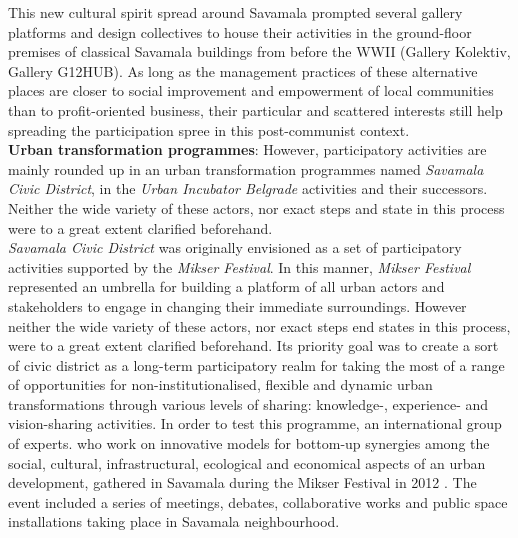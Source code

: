 \documentclass[11pt]{report}
\begin{document}
This new cultural spirit spread around Savamala prompted several gallery platforms and design collectives to house their activities in the ground-floor premises of classical Savamala buildings from before the WWII (Gallery Kolektiv, Gallery G12HUB).
As long as the management practices of these alternative places are closer to social improvement and empowerment of local communities than to profit-oriented business, their particular and scattered interests still help spreading the participation spree in this post-communist context.
\\	
\textbf{Urban transformation programmes}:
However, participatory activities are mainly rounded up in an urban transformation programmes named \textit{Savamala Civic District}, in the \textit{Urban Incubator Belgrade} activities and their successors. Neither the wide variety of these actors, nor exact steps and state in this process were to a great extent clarified beforehand.
\\
\textit{Savamala Civic District} was originally envisioned as a set of participatory activities supported by the \textit{Mikser Festival}. In this manner, \textit{Mikser Festival} represented an umbrella for building a platform of all urban actors and stakeholders to engage in changing their immediate surroundings. However neither the wide variety of these actors, nor exact steps end states in this process, were to a great extent clarified beforehand. Its priority goal was to create a sort of civic district as a long-term participatory realm for taking the most of a range of opportunities for non-institutionalised, flexible and dynamic urban transformations through various levels of sharing: knowledge-, experience- and vision-sharing activities. In order to test this programme, an international group of experts. who work on innovative models for bottom-up synergies among the social, cultural, infrastructural, ecological and economical aspects of an urban development, gathered in Savamala during the Mikser Festival in 2012 \cite{Cvetinovic et al 2013}. The event included a series of meetings, debates, collaborative works and public space installations taking place in Savamala neighbourhood\footnotemark. 
\end{document}
